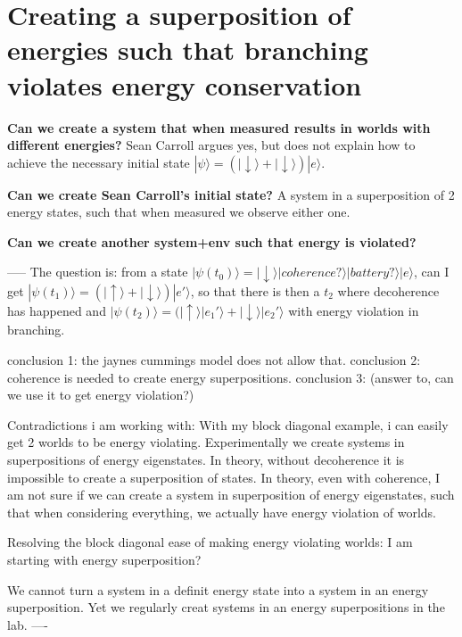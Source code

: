 \documentclass{article}
\begin{document}
\section{Creating a superposition of energies such that branching violates energy conservation}

\textbf{Can we create a system that when measured results in worlds with different energies?} Sean Carroll argues yes, but does not explain how to achieve the necessary initial state $|\psi\rangle=(|\downarrow\rangle+|\downarrow\rangle)|e\rangle$. 

\textbf{Can we create Sean Carroll's initial state?} A system in a superposition of 2 energy states, such that when measured we observe either one.

\textbf{Can we create another system+env such that energy is violated?}

-----
The question is: from a state $|\psi(t_0)\rangle=|\downarrow\rangle|coherence?\rangle|battery?\rangle|e\rangle$, can I get $|\psi(t_1)\rangle=(|\uparrow\rangle+|\downarrow\rangle)|e'\rangle$, so that there is then a $t_2$ where decoherence has happened and $|\psi(t_2)\rangle=(|\uparrow\rangle|e_1'\rangle+|\downarrow\rangle|e_2'\rangle$ with energy violation in branching.

conclusion 1: the jaynes cummings model does not allow that.
conclusion 2: coherence is needed to create energy superpositions.
conclusion 3: (answer to, can we use it to get energy violation?)

Contradictions i am working with: With my block diagonal example, i can easily get 2 worlds to be energy violating. Experimentally we create systems in superpositions of energy eigenstates. In theory, without decoherence it is impossible to create a superposition of states. In theory, even with coherence, I am not sure if we can create a system in superposition of energy eigenstates, such that when considering everything, we actually have energy violation of worlds.

Resolving the block diagonal ease of making energy violating worlds: I am starting with energy superposition?

We cannot turn a system in a definit energy state into a system in an energy superposition. Yet we regularly creat systems in an energy superpositions in the lab.
----
\end{document}
